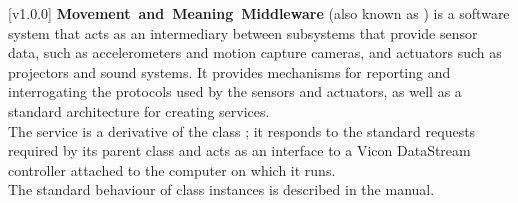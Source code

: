 [v1.0.0]
\textbf{Movement~and~Meaning~Middleware} (also known as \mplusm{}) is a software system
that acts as an intermediary between subsystems that provide sensor data, such as
accelerometers and motion capture cameras, and actuators such as projectors and sound
systems.
It provides mechanisms for reporting and interrogating the protocols used by the sensors
and actuators, as well as a standard architecture for creating services.\\

The \VDSI{} service is a derivative of the \mplusm{} class ;
it responds to the standard requests required by its parent class and acts as an interface
to a Vicon DataStream controller attached to the computer on which it runs.\\

The standard behaviour of  class instances is described in
the \emph{\MMM} manual.
\primaryEnd{}
